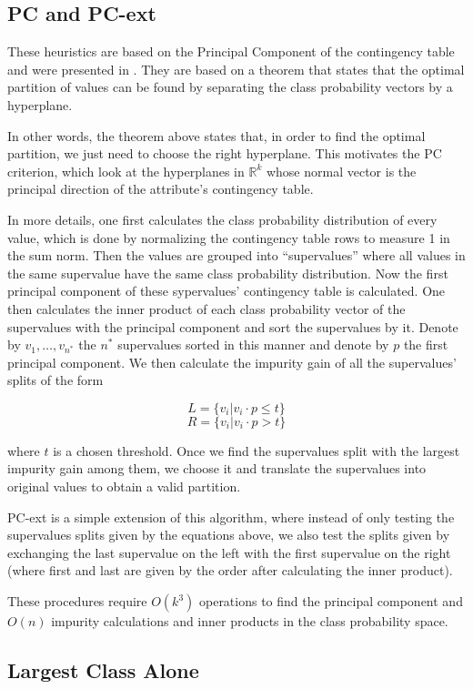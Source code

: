 \subsection{PC and PC-ext}
These heuristics are based on the Principal Component of the contingency table and were presented in \cite{journals/datamine/CoppersmithHH99}.
They are based on a theorem that states that the optimal partition of values can be found by separating the class probability vectors by a hyperplane.

In other words, the theorem above states that, in order to find the optimal partition, we just need to choose the right hyperplane. This motivates the PC criterion, which look at the hyperplanes in $\mathbb{R}^k$ whose normal vector is the principal direction of the attribute's contingency table.

In more details, one first calculates the class probability distribution of every value, which is done by normalizing the contingency table rows to measure 1 in the sum norm. Then the values are grouped into ``supervalues'' where all values in the same supervalue have the same class probability distribution. Now the first principal component of these sypervalues' contingency table is calculated. One then calculates the inner product of each class probability vector of the supervalues  with the principal component and sort the supervalues by it. Denote by $v_1,\ldots,v_{n^*}$ the $n^*$ supervalues sorted in this manner and denote by $p$ the first principal component. We then calculate the impurity gain of all the supervalues' splits of the form

$$L = \{v_i | v_i \cdot p \leq t\}$$
$$R = \{v_i | v_i \cdot p > t\}$$

where $t$ is a chosen threshold. Once we find the supervalues split with the largest impurity gain among them, we choose it and translate the supervalues into original values to obtain a valid partition.

PC-ext is a simple extension of this algorithm, where instead of only testing the supervalues splits given by the equations above, we also test the splits given by  exchanging the last supervalue on the left with the first supervalue on the right (where first and last are given by the order after calculating the inner product).

These procedures require $O(k^3)$ operations to find the principal component and $O(n)$ impurity calculations and inner products in the class probability space.

\subsection{Largest Class Alone}

